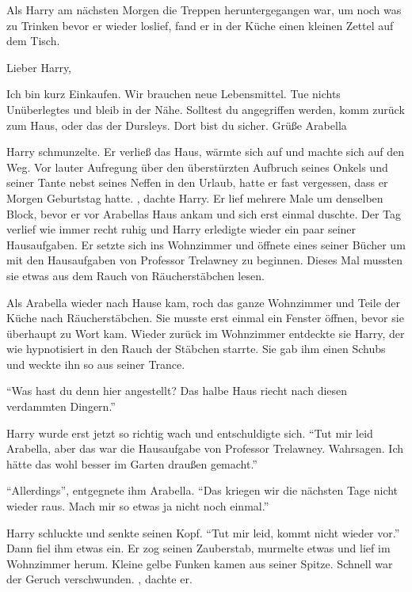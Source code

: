 \trenn

Als Harry am nächsten Morgen die Treppen heruntergegangen war, um noch was zu Trinken bevor er wieder loslief, fand er in der Küche einen kleinen Zettel auf dem Tisch.

\begin{brief}
Lieber Harry,

Ich bin kurz Einkaufen. Wir brauchen neue Lebensmittel. Tue nichts Unüberlegtes und bleib in der Nähe. Solltest du angegriffen werden, komm zurück zum Haus, oder das der Dursleys. Dort bist du sicher.
\signumspace
Grüße Arabella
\end{brief}

Harry schmunzelte. Er verließ das Haus, wärmte sich auf und machte sich auf den Weg. Vor lauter Aufregung über den überstürzten Aufbruch seines Onkels und seiner Tante nebst seines Neffen in den Urlaub, hatte er fast vergessen, dass er Morgen Geburtstag hatte. , dachte Harry.  Er lief mehrere Male um denselben Block, bevor er vor Arabellas Haus ankam und sich erst einmal duschte. Der Tag verlief wie immer recht ruhig und Harry erledigte wieder ein paar seiner Hausaufgaben. Er setzte sich ins Wohnzimmer und öffnete eines seiner Bücher um mit den Hausaufgaben von Professor Trelawney zu beginnen. Dieses Mal mussten sie etwas aus dem Rauch von Räucherstäbchen lesen. 

Als Arabella wieder nach Hause kam, roch das ganze Wohnzimmer und Teile der Küche nach Räucherstäbchen. Sie musste erst einmal ein Fenster öffnen, bevor sie überhaupt zu Wort kam. Wieder zurück im Wohnzimmer entdeckte sie Harry, der wie hypnotisiert in den Rauch der Stäbchen starrte. Sie gab ihm einen Schubs und weckte ihn so aus seiner Trance.

\enquote{Was hast du denn hier angestellt? Das halbe Haus riecht nach diesen verdammten Dingern.}

Harry wurde erst jetzt so richtig wach und entschuldigte sich. \enquote{Tut mir leid Arabella, aber das war die Hausaufgabe von Professor Trelawney. Wahrsagen. Ich hätte das wohl besser im Garten draußen gemacht.}

\enquote{Allerdings}, entgegnete ihm Arabella. \enquote{Das kriegen wir die nächsten Tage nicht wieder raus. Mach mir so etwas ja nicht noch einmal.}

Harry schluckte und senkte seinen Kopf. \enquote{Tut mir leid, kommt nicht wieder vor.} Dann fiel ihm etwas ein. Er zog seinen Zauberstab, murmelte etwas und lief im Wohnzimmer herum. Kleine gelbe Funken kamen aus seiner Spitze. Schnell war der Geruch verschwunden. , dachte er.

